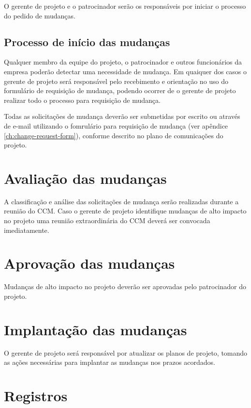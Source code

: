 O gerente de projeto e o patrocinador serão os responsáveis por iniciar o processo do pedido de mudanças.

\subsection{Processo de início das mudanças}

Qualquer membro da equipe do projeto, o patrocinador e outros funcionários da empresa poderão detectar uma necessidade de mudança. Em quaiquer dos casos o gerente de projeto será responsável pelo recebimento e orientação no uso do formulário de requisição de mudança, podendo ocorrer de o gerente de projeto realizar todo o processo para requisição de mudança.

Todas as solicitações de mudança deverão ser submetidas por escrito ou através de e-mail utilizando o fomrulário para requisição de mudança (ver apêndice \ref{ch:change-request-form}), conforme descrito no plano de comunicações do projeto.

\section{Avaliação das mudanças}

A classificação e análise das solicitações de mudança serão realizadas durante a reunião do CCM. Caso o gerente de projeto identifique mudanças de alto impacto no projeto uma reunião extraordinária do CCM deverá ser convocada imediatamente.

\section{Aprovação das mudanças}

Mudanças de alto impacto no projeto deverão ser aprovadas pelo patrocinador do projeto.

\section{Implantação das mudanças}

O gerente de projeto será responsável por atualizar os planos de projeto, tomando as ações necessárias para implantar as mudanças nos prazos acordados.

\section{Registros}

